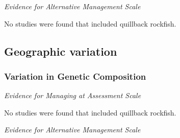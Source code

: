\documentclass[11pt,
  english,
  letterpaper,
]{article}
\begin{document}
\leavevmode\tagmcend\tagstructend\par


\emph{Evidence for Alternative Management Scale}

\leavevmode\tagmcend\tagstructend\par


No studies were found that included quillback rockfish.

\leavevmode\tagmcend\tagstructend\par


\hypertarget{geographic-variation}{%
\subsection{Geographic variation}\label{geographic-variation}}

\leavevmode\tagmcend\tagstructend


\hypertarget{variation-in-genetic-composition}{%
\subsubsection{Variation in Genetic Composition}\label{variation-in-genetic-composition}}

\leavevmode\tagmcend\tagstructend


\emph{Evidence for Managing at Assessment Scale}

\leavevmode\tagmcend\tagstructend\par


No studies were found that included quillback rockfish.

\leavevmode\tagmcend\tagstructend\par


\emph{Evidence for Alternative Management Scale}

\leavevmode\tagmcend\tagstructend\par

\end{document}
